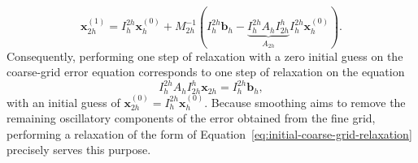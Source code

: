 \begin{equation}
	\bm{x}_{2h}^{(1)} = I_{h}^{2h} \bm{x}_{h}^{(0)} + M_{2h}^{-1} ( I_{h}^{2h} \bm{b}_h - \underbrace{I_{h}^{2h} A_h I_{2h}^{h}}_{A_{2h}} I_{h}^{2h} \bm{x}_{h}^{(0)} ).
\end{equation}
Consequently, performing one step of relaxation with a zero initial guess on the coarse-grid error equation corresponds to one step of relaxation on the equation
\begin{equation}
	I_{h}^{2h} A_h I_{2h}^h \bm{x}_{2h} = I_{h}^{2h} \bm{b}_h,
\end{equation}
with an initial guess of $\bm{x}_{2h}^{(0)} = I_{h}^{2h} \bm{x}_{h}^{(0)}$.
Because smoothing aims to remove the remaining oscillatory components of the error obtained from the fine grid, performing a relaxation of the form of Equation~\eqref{eq:initial-coarse-grid-relaxation} precisely serves this purpose.

